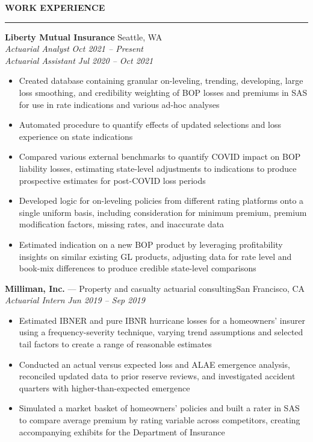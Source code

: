 \documentclass[11pt,letterpaper]{article}
\newcommand{\sectline}{\vspace{5pt}\hrule height 1.5pt\vspace{5pt}}
\newcommand{\smallspace}{\vspace{6pt}}
\begin{document}
\textbf{WORK EXPERIENCE}\sectline
\textbf{Liberty Mutual Insurance}  \hfill Seattle, WA \\
\textit{Actuarial Analyst} \hfill \textit{Oct 2021 -- Present} \\
\textit{Actuarial Assistant} \hfill \textit{Jul 2020 -- Oct 2021}
\begin{itemize}
	\item Created database containing granular on-leveling, trending, developing, large loss smoothing, and credibility weighting of BOP losses and premiums in SAS for use in rate indications and various ad-hoc analyses
	\item Automated procedure to quantify effects of updated selections and loss experience on state indications
	\item Compared various external benchmarks to quantify COVID impact on BOP liability losses, estimating state-level adjustments to indications to produce prospective estimates for post-COVID loss periods
	\item Developed logic for on-leveling policies from different rating platforms onto a single uniform basis, including consideration for minimum premium, premium modification factors, missing rates, and inaccurate data
	\item Estimated indication on a new BOP product by leveraging profitability insights on similar existing GL products, adjusting data for rate level and book-mix differences to produce credible state-level comparisons
\end{itemize}
\smallspace
\textbf{Milliman, Inc.} --- Property and casualty actuarial consulting\hfill San Francisco, CA \\
\textit{Actuarial Intern} \hfill \textit{Jun 2019 -- Sep 2019}
\begin{itemize}
	\item Estimated IBNER and pure IBNR hurricane losses for a homeowners' insurer using a frequency-severity technique, varying trend assumptions and selected tail factors to create a range of reasonable estimates
	\item Conducted an actual versus expected loss and ALAE emergence analysis, reconciled updated data to prior reserve reviews, and investigated accident quarters with higher-than-expected emergence
	\item Simulated a market basket of homeowners' policies and built a rater in SAS to compare average premium by rating variable across competitors, creating accompanying exhibits for the Department of Insurance
\end{itemize}
\end{document}
